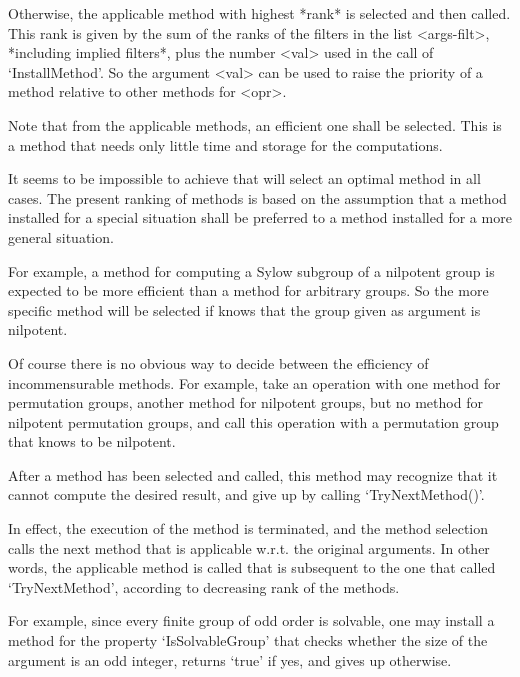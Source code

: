 Otherwise, the applicable method with highest *rank* is selected and then
called.
This rank is given by the sum of the ranks of the filters in the list
<args-filt>,
*including implied filters*,
plus the number <val> used in the call of `InstallMethod'.
So the argument <val> can be used to raise the priority of a method
relative to other methods for <opr>.

Note that from the applicable methods,
an efficient one shall be selected.
This is a method that needs only little time and storage for the
computations.

It seems to be impossible to achieve that {\GAP} will select an optimal
method in all cases.
The present ranking of methods is based on the assumption
that a method installed for a special situation shall be preferred
to a method installed for a more general situation.

For example, a method for computing a Sylow subgroup of a nilpotent
group is expected to be more efficient than a method for arbitrary
groups.
So the more specific method will be selected if {\GAP} knows that the
group given as argument is nilpotent.

Of course there is no obvious way to decide between the efficiency of
incommensurable methods.
For example, take an operation with one method for permutation groups,
another method for nilpotent groups,
but no method for nilpotent permutation groups,
and call this operation with a permutation group that knows to be
nilpotent.


After a method has been selected and called,
this method may recognize that it cannot compute the desired result,
and give up by calling `TryNextMethod()'.

In effect, the execution of the method is terminated,
and the method selection calls the next method that is applicable w.r.t.
the original arguments.
In other words, the applicable method is called that is subsequent to the
one that called `TryNextMethod',
according to decreasing rank of the methods.

For example, since every finite group of odd order is solvable,
one may install a method for the property `IsSolvableGroup' that checks
whether the size of the argument is an odd integer,
returns `true' if yes,
and gives up otherwise.


